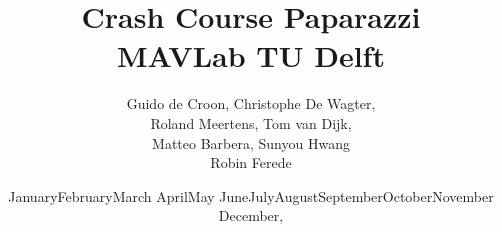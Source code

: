 \documentclass{report}
\newcommand{\todaytext}{\ifcase \month \or January\or February\or March\or %
April\or May \or June\or July\or August\or September\or October\or November\or %
December\fi, \number \year}
\begin{document}
\author{Guido de Croon, Christophe De Wagter, \\Roland Meertens, Tom van Dijk, \\Matteo Barbera, Sunyou Hwang \\Robin Ferede}
\title{\bf Crash Course Paparazzi \the\year\\MAVLab TU Delft}
\date{\todaytext}
\maketitle

\tableofcontents

\setlength{\parindent}{0em}





	
\end{document}
